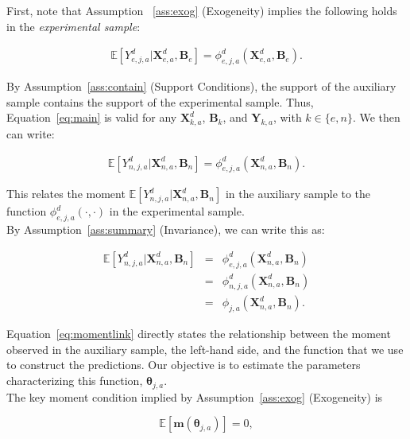 \noindent First, note that Assumption ~\ref{ass:exog} (Exogeneity) implies the following holds in the \textit{experimental sample}: 

\begin{eqnarray}
\mathbb{E} \left[ Y_{e,j,a}^d | \bm{X}_{e,a}^d, \bm{B}_{e} \right] =  \phi^d_{e,j,a}\left( \bm{X}_{e,a}^d, \bm{B}_{e} \right). \label{eq:main}
\end{eqnarray}

\noindent By Assumption~\ref{ass:contain} (Support Conditions), the support of the auxiliary sample contains the support of the experimental sample. Thus, Equation~\eqref{eq:main} is valid for any $\bm{X}^d_{k,a}$, $\bm{B}_{k}$, and $\bm{Y}_{k,a}$, with $k \in \{ e, n\}$. We then can write: 

\begin{eqnarray}
\mathbb{E} \left[ Y_{n,j,a}^d | \bm{X}_{n,a}^d, \bm{B}_{n} \right] =  \phi^d_{e,j,a}\left( \bm{X}_{n,a}^d, \bm{B}_{n} \right).
\end{eqnarray}

\noindent This relates the moment $\mathbb{E} \left[ Y_{n,j,a}^d | \bm{X}_{n,a}^d, \bm{B}_{n} \right]$ in the auxiliary sample to the function  $\phi^d_{e,j,a}\left( \cdot, \cdot \right)$ in the experimental sample.\\

\noindent By Assumption~\ref{ass:summary} (Invariance), we can write this as: 

\begin{eqnarray}\label{eq:momentlink}
\mathbb{E} \left[ Y_{n,j,a}^d | \bm{X}_{n,a}^d, \bm{B}_{n} \right] &=&  \phi^d_{e,j,a}\left( \bm{X}_{n,a}^d, \bm{B}_{n} \right) \nonumber \\ 
 &=&  \phi^d_{n,j,a}\left( \bm{X}_{n,a}^d, \bm{B}_{n} \right) \nonumber \\
 &=&  \phi_{j,a}\left( \bm{X}_{n,a}^d, \bm{B}_{n} \right). \label{eq:mainpred}
\end{eqnarray}

\noindent Equation~\eqref{eq:momentlink} directly states the relationship between the moment observed in the auxiliary sample, the left-hand side, and the function that we use to construct the predictions. Our objective is to estimate the parameters characterizing this function, $\bm{\theta}_{j,a}$.\\ 

\noindent The key moment condition implied by Assumption~\ref{ass:exog} (Exogeneity) is 

\begin{equation}
\mathbb{E} \left[ \bm{m} \left( \bm{\theta}_{j,a} \right) \right] = 0, \label{eq:moment}
\end{equation}

